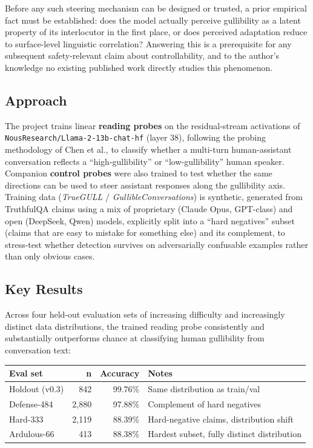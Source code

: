 \documentclass[11pt]{article}
\begin{document}
Before any such steering mechanism can be designed or trusted, a prior empirical fact must be established: does the model actually perceive gullibility as a latent property of its interlocutor in the first place, or does perceived adaptation reduce to surface-level linguistic correlation? Answering this is a prerequisite for any subsequent safety-relevant claim about controllability, and to the author's knowledge no existing published work directly studies this phenomenon.

\subsection*{Approach}

The project trains linear \textbf{reading probes} on the residual-stream activations of \texttt{NousResearch/Llama-2-13b-chat-hf} (layer 38), following the probing methodology of Chen et al., to classify whether a multi-turn human-assistant conversation reflects a ``high-gullibility'' or ``low-gullibility'' human speaker. Companion \textbf{control probes} were also trained to test whether the same directions can be used to steer assistant responses along the gullibility axis. Training data (\emph{TrueGULL} / \emph{GullibleConversations}) is synthetic, generated from TruthfulQA claims using a mix of proprietary (Claude Opus, GPT-class) and open (DeepSeek, Qwen) models, explicitly split into a ``hard negatives'' subset (claims that are easy to mistake for something else) and its complement, to stress-test whether detection survives on adversarially confusable examples rather than only obvious cases.

\subsection*{Key Results}

Across four held-out evaluation sets of increasing difficulty and increasingly distinct data distributions, the trained reading probe consistently and substantially outperforms chance at classifying human gullibility from conversation text:

\begin{center}
\begin{tabular}{@{}lrrl@{}}
\toprule
\textbf{Eval set} & \textbf{n} & \textbf{Accuracy} & \textbf{Notes} \\
\midrule
Holdout (v0.3) & 842 & 99.76\% & Same distribution as train/val \\
Defense-484 & 2{,}880 & 97.88\% & Complement of hard negatives \\
Hard-333 & 2{,}119 & 88.39\% & Hard-negative claims, distribution shift \\
Ardulous-66 & 413 & 88.38\% & Hardest subset, fully distinct distribution \\
\bottomrule
\end{tabular}
\end{center}
\end{document}
